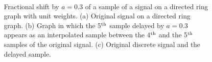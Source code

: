 \begin{figure}[b]
\centering
{}
\\
% 
\caption{Fractional shift by $a=0{.}3 $ of a sample of a signal on a directed ring graph with unit weights. (a) Original signal on a directed ring graph. (b) Graph in which the 5$\textsuperscript{th}$ sample delayed by $a=0{.}3 $ appears as an interpolated sample between the 4$\textsuperscript{th}$ and the 5$\textsuperscript{th}$ samples of the original signal. (c) Original discrete signal and the delayed sample.}
\label{fig:frac_delay_directed}
\end{figure}


